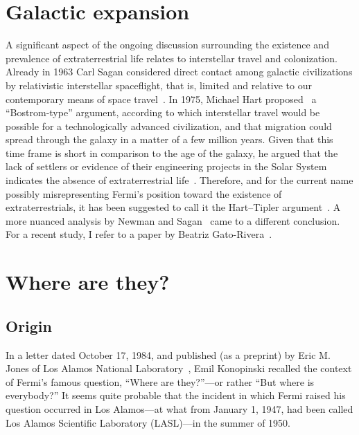 \section{Galactic expansion}
\label{2023-UFO-part-Speculation-among-hypercivilization-zoo-hypothesis-ex}

A significant aspect of the ongoing discussion surrounding the existence and prevalence of extraterrestrial life relates to interstellar travel
and colonization.
Already in 1963 Carl Sagan considered direct contact among galactic civilizations
by relativistic interstellar spaceflight, that is, limited and relative to our contemporary means of space travel~\cite{Sagan_1963}.
In 1975, Michael Hart proposed~\cite{1975QJRAS..16..128H,hart_1995} a ``Bostrom-type'' argument,
according to which interstellar travel would be possible for a technologically advanced civilization,
and that migration could spread through the galaxy in a matter of a few million years.
Given that this time frame is short in comparison to the age of the galaxy, he argued that the
lack of settlers or evidence of their engineering projects in the Solar System indicates the absence of extraterrestrial life~\cite{Jones-1985}.
Therefore, and for the current name possibly misrepresenting Fermi's position toward the existence of extraterrestrials,
it has been suggested to call it the Hart--Tipler argument~\cite{Gray-2015}.
A more nuanced analysis by Newman and Sagan~\cite{Newman_1981} came to a different conclusion.
For a recent study, I refer to a paper by Beatriz Gato-Rivera~\cite{Gato-Rivera2005Dec}.


\section{Where are they?}
\label{2023-UFO-part-Speculation-among-hypercivilization-zoo-hypothesis-fp}


\subsection{Origin}

In a letter dated October 17, 1984, and published (as a preprint) by Eric M. Jones of Los Alamos National Laboratory~\cite{Jones-1985}, Emil Konopinski recalled the context of Fermi's famous question, ``Where are they?''---or rather ``But where is everybody?'' It seems quite probable that the incident in which Fermi raised his question occurred in Los Alamos---at what from January 1, 1947, had been called Los Alamos Scientific Laboratory (LASL)---in the summer of 1950.

